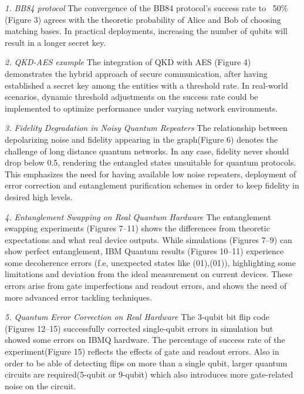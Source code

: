 \documentclass[12pt]{ieeetj}
\begin{document}
	\textit{1. BB84 protocol}
	\newline
	The convergence of the BB84 protocol’s success rate to ~50\% (Figure 3) agrees with the theoretic probability 
	of Alice and Bob of choosing matching bases. 
	In practical deployments, increasing the number of qubits will result in a longer secret key.
	

	\textit{2. QKD-AES example}
	\newline
	The integration of QKD with AES (Figure 4) demonstrates the hybrid approach of secure communication, 
	after having established a secret key among the entities with a threshold rate.
	In real-world scenarios, dynamic threshold adjustments on the success rate could be implemented to
	optimize performance under varying network environments. 
	

\textit{3. Fidelity Degradation in Noisy Quantum Repeaters}
	\newline
	The relationship between depolarizing noise and fidelity appearing in the graph(Figure 6) denotes the challenge of long distance quantum networks. 
	In any case, fidelity never should drop below 0.5, rendering the entangled states unsuitable for quantum protocols. 
	This emphasizes the need for having available low noise repeaters,
	deployment of error correction and entanglement purification schemes in order to keep fidelity in desired high levels.

\textit{4. Entanglement Swapping on Real Quantum Hardware}
	\newline
	The entanglement swapping experiments (Figures 7–11) shows the differences from theoretic expectations and what real device outputs. 
	While simulations (Figures 7–9) can show perfect entanglement, IBM Quantum results (Figures 10–11) experience some decoherence errors 
	(f.e, unexpected states like (01),(01)), highlighting some limitations and deviation from the ideal measurement on current devices. 
	These errors arise from gate imperfections and readout errors, and shows the need of more advanced error tackling techniques.

\textit{5. Quantum Error Correction on Real Hardware}
	\newline
	The 3-qubit bit flip code (Figures 12–15) successfully corrected single-qubit errors in simulation 
	but showed some errors on IBMQ hardware. 
	The percentage of success rate of the experiment(Figure 15) reflects the effects of gate and readout errors. 
	Also in order to be able of detecting flips on more than a single qubit, 
	larger quantum circuits are required(5-qubit or 9-qubit) which also introduces
	more gate-related noise on the circuit.
\end{document}
